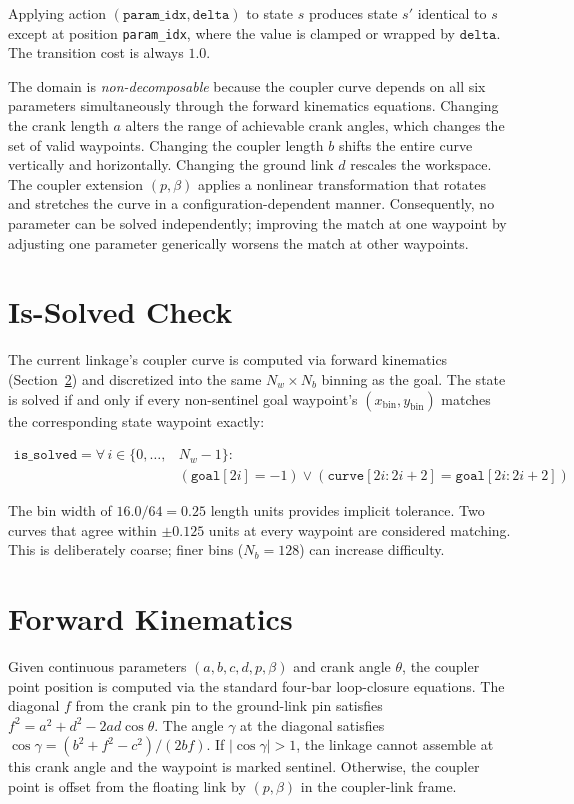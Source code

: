 \documentclass[11pt]{article}
\begin{document}
Applying action $(\texttt{param\_idx}, \texttt{delta})$ to state $s$ produces state $s'$ identical to $s$ except at position \texttt{param\_idx}, where the value is clamped or wrapped by $\texttt{delta}$. The transition cost is always $1.0$.

The domain is \textit{non-decomposable} because the coupler curve depends on all six parameters simultaneously through the forward kinematics equations. Changing the crank length $a$ alters the range of achievable crank angles, which changes the set of valid waypoints. Changing the coupler length $b$ shifts the entire curve vertically and horizontally. Changing the ground link $d$ rescales the workspace. The coupler extension $(p, \beta)$ applies a nonlinear transformation that rotates and stretches the curve in a configuration-dependent manner. Consequently, no parameter can be solved independently; improving the match at one waypoint by adjusting one parameter generically worsens the match at other waypoints.

\section{Is-Solved Check}

The current linkage's coupler curve is computed via forward kinematics (Section~\ref{sec:fk}) and discretized into the same $N_w \times N_b$ binning as the goal. The state is solved if and only if every non-sentinel goal waypoint's $(x_{\text{bin}}, y_{\text{bin}})$ matches the corresponding state waypoint exactly:

\begin{align}
    \texttt{is\_solved} = \forall\, i \in \{0, \ldots, &N_w - 1\} : \nonumber \\
    &(\texttt{goal}[2i] = -1) \lor (\texttt{curve}[2i{:}2i{+}2] = \texttt{goal}[2i{:}2i{+}2])
\end{align}

The bin width of $16.0 / 64 = 0.25$ length units provides implicit tolerance. Two curves that agree within $\pm 0.125$ units at every waypoint are considered matching. This is deliberately coarse; finer bins ($N_b = 128$) can increase difficulty.

\section{Forward Kinematics}
\label{sec:fk}

Given continuous parameters $(a, b, c, d, p, \beta)$ and crank angle $\theta$, the coupler point position is computed via the standard four-bar loop-closure equations. The diagonal $f$ from the crank pin to the ground-link pin satisfies $f^2 = a^2 + d^2 - 2ad\cos\theta$. The angle $\gamma$ at the diagonal satisfies $\cos\gamma = (b^2 + f^2 - c^2) / (2bf)$. If $|\cos\gamma| > 1$, the linkage cannot assemble at this crank angle and the waypoint is marked sentinel. Otherwise, the coupler point is offset from the floating link by $(p, \beta)$ in the coupler-link frame.
\end{document}

